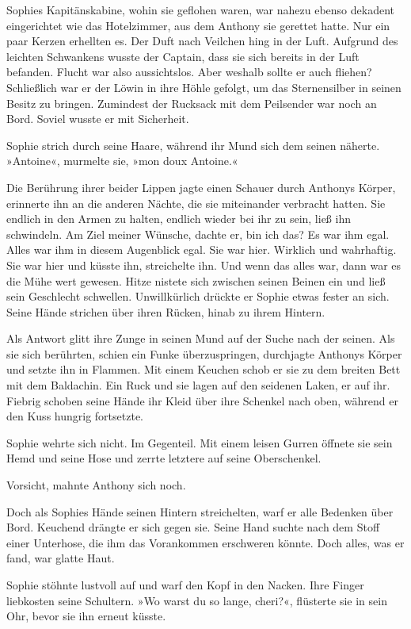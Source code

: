 \tb

Sophies Kapitänskabine, wohin sie geflohen waren, war nahezu ebenso
dekadent eingerichtet wie das Hotelzimmer, aus dem Anthony sie
gerettet hatte. Nur ein paar Kerzen erhellten es. Der Duft nach
Veilchen hing in der Luft. Aufgrund des leichten Schwankens wusste
der Captain, dass sie sich bereits in der Luft befanden. Flucht war
also aussichtslos. Aber weshalb sollte er auch fliehen? Schließlich
war er der Löwin in ihre Höhle gefolgt, um das Sternensilber in
seinen Besitz zu bringen. Zumindest der Rucksack mit dem Peilsender
war noch an Bord. Soviel wusste er mit Sicherheit.

Sophie strich durch seine Haare, während ihr Mund sich dem seinen
näherte. »Antoine«, murmelte sie, »mon doux Antoine.«

Die Berührung ihrer beider Lippen jagte einen Schauer durch
Anthonys Körper, erinnerte ihn an die anderen Nächte, die sie
miteinander verbracht hatten. Sie endlich in den Armen zu halten,
endlich wieder bei ihr zu sein, ließ ihn schwindeln. Am Ziel meiner
Wünsche, dachte er, bin ich das? Es war ihm egal. Alles war ihm in
diesem Augenblick egal. Sie war hier. Wirklich und wahrhaftig. Sie
war hier und küsste ihn, streichelte ihn. Und wenn das alles war,
dann war es die Mühe wert gewesen. Hitze nistete sich zwischen
seinen Beinen ein und ließ sein Geschlecht schwellen. Unwillkürlich
drückte er Sophie etwas fester an sich. Seine Hände strichen über
ihren Rücken, hinab zu ihrem Hintern.

Als Antwort glitt ihre Zunge in seinen Mund auf der Suche nach der
seinen. Als sie sich berührten, schien ein Funke überzuspringen,
durchjagte Anthonys Körper und setzte ihn in Flammen. Mit einem
Keuchen schob er sie zu dem breiten Bett mit dem Baldachin. Ein
Ruck und sie lagen auf den seidenen Laken, er auf ihr. Fiebrig
schoben seine Hände ihr Kleid über ihre Schenkel nach oben, während
er den Kuss hungrig fortsetzte.

Sophie wehrte sich nicht. Im Gegenteil. Mit einem leisen Gurren
öffnete sie sein Hemd und seine Hose und zerrte letztere auf seine
Oberschenkel.

Vorsicht, mahnte Anthony sich noch.

Doch als Sophies Hände seinen Hintern streichelten, warf er alle
Bedenken über Bord. Keuchend drängte er sich gegen sie. Seine Hand
suchte nach dem Stoff einer Unterhose, die ihm das Vorankommen
erschweren könnte. Doch alles, was er fand, war glatte Haut.

Sophie stöhnte lustvoll auf und warf den Kopf in den Nacken. Ihre
Finger liebkosten seine Schultern. »Wo warst du so lange, cheri?«,
flüsterte sie in sein Ohr, bevor sie ihn erneut küsste.


